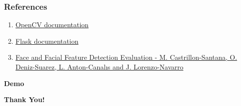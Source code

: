 \documentclass[14pt]{beamer}
\begin{document}
\begin{frame}
    \frametitle{References}
    \begin{enumerate}
        \item \href{https://opencv.org/}{OpenCV documentation} 
        \item \href{https://flask.palletsprojects.com/en/1.1.x/}{Flask documentation} 
        \item \href{http://alereimondo.no-ip.org/OpenCV/uploads/37/CameraReadyPaper63.pdf}{Face and Facial Feature Detection Evaluation  \newline - M. Castrillon-Santana, O. Deniz-Suarez, L. Anton-Canalıs and J. Lorenzo-Navarro}
    \end{enumerate}
\end{frame}

\begin{frame}[c]{ }
    \centering
\huge \textbf{Demo}
\end{frame}

\begin{frame}[c]{ }
    \centering
\huge \textbf{Thank You!}
\end{frame}
\end{document}
